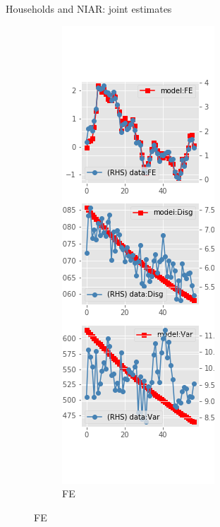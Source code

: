 \documentclass{beamer}
\begin{document}
\begin{frame}{Households and NIAR: joint estimates}
	\begin{figure}[ht]
		\label{NI_diag_SCE_joint}
		\begin{subfigure}[b]{0.2\textwidth}
			\centering
			\caption{FE}
			\includegraphics[width=\textwidth, height = 0.8\textheight]{figuresDraft/sce_ni_est_joint_diag0.png}

\end{subfigure}
\end{figure}
\end{frame}
\end{document}
